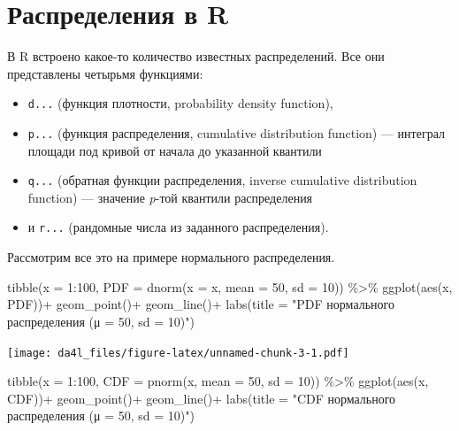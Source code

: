 \documentclass[
]{book}
\newenvironment{Shaded}{\begin{snugshade}}{\end{snugshade}}
\newcommand{\AttributeTok}[1]{\textcolor[rgb]{0.77,0.63,0.00}{#1}}
\newcommand{\DecValTok}[1]{\textcolor[rgb]{0.00,0.00,0.81}{#1}}
\newcommand{\FunctionTok}[1]{\textcolor[rgb]{0.00,0.00,0.00}{#1}}
\newcommand{\NormalTok}[1]{#1}
\newcommand{\SpecialCharTok}[1]{\textcolor[rgb]{0.00,0.00,0.00}{#1}}
\newcommand{\StringTok}[1]{\textcolor[rgb]{0.31,0.60,0.02}{#1}}
\providecommand{\tightlist}{%
  \setlength{\itemsep}{0pt}\setlength{\parskip}{0pt}}
\begin{document}
\hypertarget{ux440ux430ux441ux43fux440ux435ux434ux435ux43bux435ux43dux438ux44f-ux432-r}{%
\section{Распределения в R}\label{ux440ux430ux441ux43fux440ux435ux434ux435ux43bux435ux43dux438ux44f-ux432-r}}

В R встроено какое-то количество известных распределений. Все они представлены четырьмя функциями:

\begin{itemize}
\tightlist
\item
  \texttt{d...} (функция плотности, probability density function),
\item
  \texttt{p...} (функция распределения, cumulative distribution function) --- интеграл площади под кривой от начала до указанной квантили
\item
  \texttt{q...} (обратная функции распределения, inverse cumulative distribution function) --- значение \emph{p}-той квантили распределения
\item
  и \texttt{r...} (рандомные числа из заданного распределения).
\end{itemize}

Рассмотрим все это на примере нормального распределения.

\begin{Shaded}
\begin{Highlighting}[]
\FunctionTok{tibble}\NormalTok{(}\AttributeTok{x =} \DecValTok{1}\SpecialCharTok{:}\DecValTok{100}\NormalTok{,}
       \AttributeTok{PDF =} \FunctionTok{dnorm}\NormalTok{(}\AttributeTok{x =}\NormalTok{ x, }\AttributeTok{mean =} \DecValTok{50}\NormalTok{, }\AttributeTok{sd =} \DecValTok{10}\NormalTok{)) }\SpecialCharTok{\%\textgreater{}\%} 
  \FunctionTok{ggplot}\NormalTok{(}\FunctionTok{aes}\NormalTok{(x, PDF))}\SpecialCharTok{+}
  \FunctionTok{geom\_point}\NormalTok{()}\SpecialCharTok{+}
  \FunctionTok{geom\_line}\NormalTok{()}\SpecialCharTok{+}
  \FunctionTok{labs}\NormalTok{(}\AttributeTok{title =} \StringTok{"PDF нормального распределения (μ = 50, sd = 10)"}\NormalTok{)}
\end{Highlighting}
\end{Shaded}

\texttt{[image: da4l\_files/figure-latex/unnamed-chunk-3-1.pdf]}

\begin{Shaded}
\begin{Highlighting}[]
\FunctionTok{tibble}\NormalTok{(}\AttributeTok{x =} \DecValTok{1}\SpecialCharTok{:}\DecValTok{100}\NormalTok{,}
       \AttributeTok{CDF =} \FunctionTok{pnorm}\NormalTok{(x, }\AttributeTok{mean =} \DecValTok{50}\NormalTok{, }\AttributeTok{sd =} \DecValTok{10}\NormalTok{)) }\SpecialCharTok{\%\textgreater{}\%} 
  \FunctionTok{ggplot}\NormalTok{(}\FunctionTok{aes}\NormalTok{(x, CDF))}\SpecialCharTok{+}
  \FunctionTok{geom\_point}\NormalTok{()}\SpecialCharTok{+}
  \FunctionTok{geom\_line}\NormalTok{()}\SpecialCharTok{+}
  \FunctionTok{labs}\NormalTok{(}\AttributeTok{title =} \StringTok{"CDF нормального распределения (μ = 50, sd = 10)"}\NormalTok{)}
\end{Highlighting}
\end{Shaded}
\end{document}
